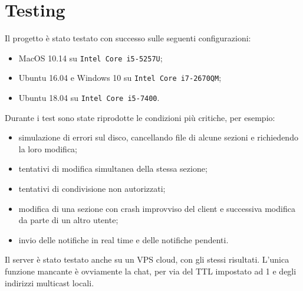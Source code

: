 \section{Testing}
Il progetto è stato testato con successo sulle seguenti configurazioni:

\begin{itemize}
	\item MacOS 10.14 su \texttt{Intel Core i5-5257U};
	\item Ubuntu 16.04 e Windows 10 su \texttt{Intel Core i7-2670QM};
	\item Ubuntu 18.04 su \texttt{Intel Core i5-7400}.
\end{itemize}
Durante i test sono state riprodotte le condizioni più critiche, per esempio:
\begin{itemize}
	\item simulazione di errori sul disco, cancellando file di alcune sezioni e richiedendo la loro modifica;
	\item tentativi di modifica simultanea della stessa sezione;
	\item tentativi di condivisione non autorizzati;
	\item modifica di una sezione con crash improvviso del client e successiva modifica da parte di un altro utente;
	\item invio delle notifiche in real time e delle notifiche pendenti.
\end{itemize}

Il server è stato testato anche su un VPS cloud, con gli stessi risultati. L'unica funzione mancante è ovviamente la chat, per via del TTL impostato ad 1 e degli indirizzi multicast locali.
